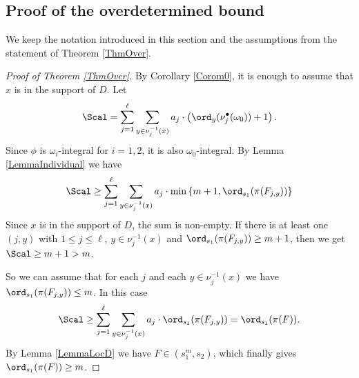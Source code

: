 \subsection{Proof of the overdetermined bound} We keep the notation introduced in this section and the assumptions from the statement of Theorem \ref{ThmOver}.
\begin{proof}[Proof of Theorem \ref{ThmOver}] By Corollary \ref{Corom0}, it is enough to assume that $x$ is in the support of $D$.  Let
$$
\Scal= \sum_{j=1}^\ell \sum_{y\in \nu_j^{-1}(x)} a_j\cdot \left(\ord_y (\nu_j^\bullet (\omega_0))+1 \right).
$$
Since $\phi$ is $\omega_i$-integral for $i=1,2$, it is also $\omega_0$-integral. By Lemma \ref{LemmaIndividual} we have
$$
\Scal\ge \sum_{j=1}^\ell \sum_{y\in \nu_j^{-1}(x)} a_j\cdot \min\left\{ m+1 , \ord_{s_1}(\pi(F_{j,y}))\right\}
$$
Since $x$ is in the support of $D$, the sum is non-empty. If there is at least one $(j,y)$ with  $1\le j\le \ell$, $y\in \nu_j^{-1}(x)$ and $\ord_{s_1}(\pi(F_{j,y}))\ge m+1$, then we get $\Scal\ge m+1>m$.

So we can assume that for each $j$ and each $y\in\nu_j^{-1}(x)$ we have $\ord_{s_1}(\pi(F_{j,y}))\le m$. In this case
$$
\Scal\ge \sum_{j=1}^\ell \sum_{y\in \nu_j^{-1}(x)} a_j\cdot \ord_{s_1}(\pi(F_{j,y})) = \ord_{s_1} (\pi(F)).
$$
By Lemma \ref{LemmaLocD} we have $F\in (s_1^m,s_2)$, which finally gives $\ord_{s_1} (\pi(F))\ge m$.
\end{proof}


